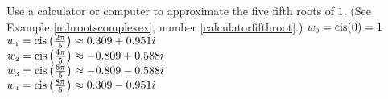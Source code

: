 { Use a calculator or computer to approximate the five fifth roots of $1$.  (See Example \ref{nthrootscomplexex}, number \ref{calculatorfifthroot}.)}
{ $w_{\text{\tiny$0$}} = \operatorname{cis}(0) = 1$\\$w_{\text{\tiny$1$}} = \operatorname{cis}\left(\frac{2\pi}{5}\right) \approx 0.309 + 0.951i$\\$w_{\text{\tiny$2$}} = \operatorname{cis}\left(\frac{4\pi}{5}\right) \approx -0.809 + 0.588i$\\$w_{\text{\tiny$3$}} = \operatorname{cis}\left(\frac{6\pi}{5}\right) \approx -0.809 - 0.588i$\\$w_{\text{\tiny$4$}} = \operatorname{cis}\left(\frac{8\pi}{5}\right) \approx 0.309 - 0.951i$}
